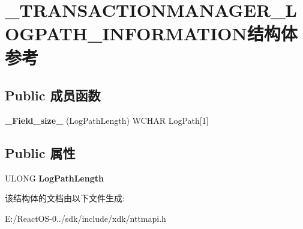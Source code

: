 \hypertarget{struct___t_r_a_n_s_a_c_t_i_o_n_m_a_n_a_g_e_r___l_o_g_p_a_t_h___i_n_f_o_r_m_a_t_i_o_n}{}\section{\+\_\+\+T\+R\+A\+N\+S\+A\+C\+T\+I\+O\+N\+M\+A\+N\+A\+G\+E\+R\+\_\+\+L\+O\+G\+P\+A\+T\+H\+\_\+\+I\+N\+F\+O\+R\+M\+A\+T\+I\+O\+N结构体 参考}
\label{struct___t_r_a_n_s_a_c_t_i_o_n_m_a_n_a_g_e_r___l_o_g_p_a_t_h___i_n_f_o_r_m_a_t_i_o_n}
\subsection*{Public 成员函数}
\begin{DoxyCompactItemize}
\item 
\mbox{\label{struct___t_r_a_n_s_a_c_t_i_o_n_m_a_n_a_g_e_r___l_o_g_p_a_t_h___i_n_f_o_r_m_a_t_i_o_n_a4557151f1a103de90ab9bbf203098498}} 
{\bfseries \+\_\+\+Field\+\_\+size\+\_\+} (Log\+Path\+Length) W\+C\+H\+AR Log\+Path\mbox{[}1\mbox{]}
\end{DoxyCompactItemize}
\subsection*{Public 属性}
\begin{DoxyCompactItemize}
\item 
\mbox{\label{struct___t_r_a_n_s_a_c_t_i_o_n_m_a_n_a_g_e_r___l_o_g_p_a_t_h___i_n_f_o_r_m_a_t_i_o_n_a0f0d652672c8b9f192c27b2237a64366}} 
U\+L\+O\+NG {\bfseries Log\+Path\+Length}
\end{DoxyCompactItemize}


该结构体的文档由以下文件生成\+:\begin{DoxyCompactItemize}
\item 
E\+:/\+React\+O\+S-\/0../sdk/include/xdk/nttmapi.\+h\end{DoxyCompactItemize}
